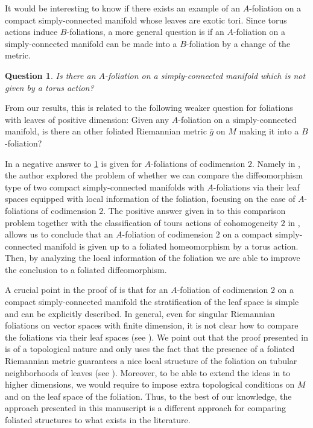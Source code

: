 \documentclass[12pt,a4paper,reqno]{amsart}
\newtheorem{question}{Question}
\theoremstyle{definition}
\numberwithin{equation}{section}
\begin{document}
It would be interesting to know if there exists an example of an $A$-foliation on a compact simply-connected manifold whose leaves are exotic tori. Since torus actions induce $B$-foliations, a more general question is if an $A$-foliation on a simply-connected manifold can be made into a $B$-foliation by a change of the metric.

\begin{question}\th\label{Q: Question 2}
Is there an $A$-foliation on a simply-connected manifold which is not given by a torus action? 
\end{question}

From our results, this is related to the following weaker question for foliations with leaves of positive dimension: Given any  $A$-foliation on a simply-connected manifold,  is there an other foliated Riemannian metric $\bar{g}$ on $M$ making it into a $B$-foliation?

In \cite[Theorem A]{Corro2023} a negative answer to \th\ref{Q: Question 2} is given for $A$-foliations of codimension $2$. Namely in \cite{Corro2023}, the author explored the problem of whether we can compare the diffeomorphism type of two compact simply-connected manifolds with $A$-foliations via their leaf spaces equipped with local information of the foliation, focusing on the case of $A$-foliations of codimension $2$. The positive answer given in \cite[Theorem C and Lemma 5.11]{Corro2023} to this comparison problem together with the classification of tours actions of cohomogeneity $2$ in \cite{Oh1983}, allows us to conclude that an $A$-foliation of codimension $2$ on a compact simply-connected manifold is given up to a foliated homeomorphism by a torus action. Then, by analyzing the local information of the foliation we are able to improve the conclusion to a foliated diffeomorphism. 

A crucial point in the proof of \cite[Theorem A]{Corro2023} is that for an $A$-foliation of codimension $2$ on a compact simply-connected manifold the stratification of the leaf space  is simple and can be explicitly described. In general, even for singular Riemannian foliations on  vector spaces with finite dimension, it is not clear how to compare the foliations via their leaf spaces (see  \cite[Question 1.2]{GorodskiLytchak2014}). We point out that the proof presented in \cite{Corro2023} is of a topological nature and only uses the fact that the presence of a foliated Riemannian metric guarantees a nice local structure of the foliation on  tubular neighborhoods of leaves (see \cite{MendesRadeschi2019}). Moreover, to be able to extend the ideas in \cite{Corro2023} to higher dimensions, we would require to impose extra topological conditions on $M$ and on the leaf space of the foliation. Thus, to the best of our knowledge, the approach presented in this manuscript is a different approach for comparing foliated structures to what exists in the literature.
\end{document}

